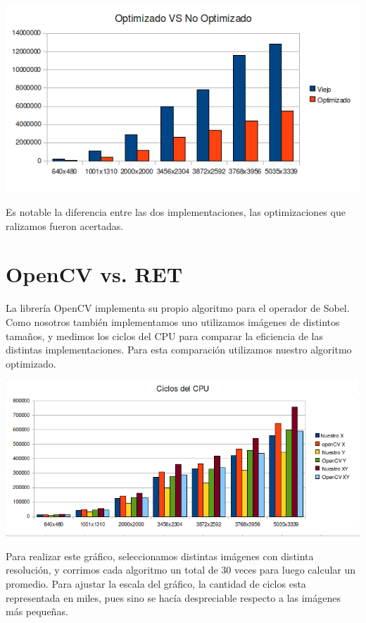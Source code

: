 \documentclass[a4paper, 10pt]{article}
\begin{document}
\begin{center}
	\includegraphics[scale=0.60]{Graficos/ViejoVSOptimizado.png}
\end{center}

Es notable la diferencia entre las dos implementaciones, las optimizaciones que ralizamos fueron acertadas.


\section{OpenCV vs. RET}

La librer\'ia OpenCV implementa su propio algoritmo para el operador de Sobel.
Como nosotros tambi\'en implementamos uno utilizamos im\'agenes de distintos tama\~nos, y medimos los ciclos del CPU para comparar la eficiencia de las distintas implementaciones.
Para esta comparaci\'on utilizamos nuestro algoritmo optimizado.

\begin{center}
	\includegraphics[scale=0.60]{Graficos/ciclosCPU.png}
\end{center}

Para realizar este gr\'afico, seleccionamos distintas im\'agenes con distinta resoluci\'on, y corrimos cada algoritmo un total de 30 veces para luego calcular un promedio.
Para ajustar la escala del gr\'afico, la cantidad de ciclos esta representada en miles, pues sino se hac\'ia despreciable respecto a las im\'agenes m\'as peque\~nas. \\ 
\end{document}
